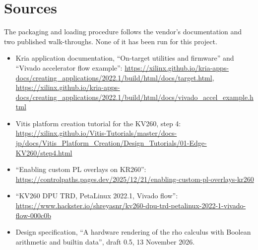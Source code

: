 \section{Sources}\label{sec:sources}

The packaging and loading procedure follows the vendor's documentation and
two published walk-throughs. None of it has been run for this project.
\begin{itemize}\raggedright
\item Kria application documentation, ``On-target utilities and firmware''
and ``Vivado accelerator flow example'':
\url{https://xilinx.github.io/kria-apps-docs/creating_applications/2022.1/build/html/docs/target.html},
\url{https://xilinx.github.io/kria-apps-docs/creating_applications/2022.1/build/html/docs/vivado_accel_example.html}
\item Vitis platform creation tutorial for the KV260, step 4:
\url{https://xilinx.github.io/Vitis-Tutorials/master/docs-jp/docs/Vitis_Platform_Creation/Design_Tutorials/01-Edge-KV260/step4.html}
\item ``Enabling custom PL overlays on KR260'':
\url{https://controlpaths.pages.dev/2025/12/21/enabling-custom-pl-overlays-kr260}
\item ``KV260 DPU TRD, PetaLinux 2022.1, Vivado flow'':
\url{https://www.hackster.io/shreyasnr/kv260-dpu-trd-petalinux-2022-1-vivado-flow-000c0b}
\item Design specification, ``A hardware rendering of the rho calculus with
Boolean arithmetic and builtin data'', draft 0.5, 13 November 2026.
\end{itemize}
